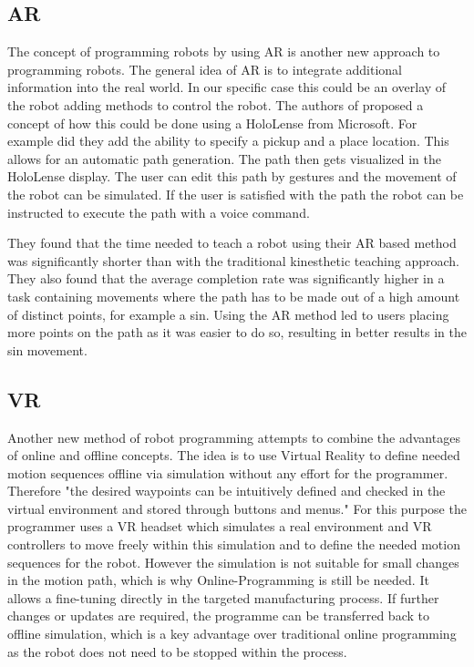 \documentclass[conference]{IEEEtran}
\begin{document}
    \subsection{AR}
    
        The concept of programming robots by using AR is another new approach to programming robots.
        The general idea of AR is to integrate additional information into the real world. In our specific case this could be an overlay of the robot adding methods to control the robot.
        The authors of \cite{p3} proposed a concept of how this could be done using a HoloLense from Microsoft.
        For example did they add the ability to specify a pickup and a place location. This allows for an automatic path generation. The path then gets visualized in the HoloLense display. The user can edit this path by gestures and the movement of the robot can be simulated.
        If the user is satisfied with the path the robot can be instructed to execute the path with a voice command. %
        \cite[p. 2]{p3}

        They found that the time needed to teach a robot using their AR based method was significantly shorter than with the traditional kinesthetic teaching approach. 
        They also found that the average completion rate was significantly higher in a task containing movements where the path has to be made out of a high amount of distinct points, for example a sin. Using the AR method led to users placing more points on the path as it was easier to do so, resulting in better results in the sin movement.
        \cite[pp. 4-5]{p3}

    \subsection{VR}
        Another new method of robot programming attempts to combine the advantages of online and offline concepts. The idea is to use Virtual Reality to define needed motion sequences offline via simulation without any effort for the programmer. Therefore "the desired waypoints can be intuitively defined and checked in the virtual environment and stored through buttons and menus."  \cite[625]{p2} For this purpose the programmer uses a VR headset which simulates a real environment and VR controllers to move freely within this simulation and to define the needed motion sequences for the robot. \cite[627]{p2}
        However the simulation is not suitable for small changes in the motion path, which is why Online-Programming is still be needed. It allows a fine-tuning directly in the targeted manufacturing process. If further changes or updates are required, the programme can be transferred back to offline simulation, which is a key advantage over traditional online programming as the robot does not need to be stopped within the process. \cite[625]{p2}
\end{document}

